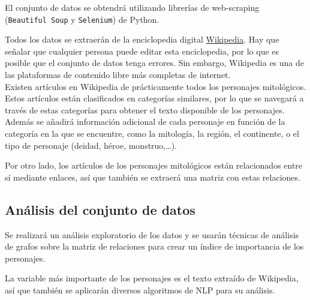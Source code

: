 \documentclass[letterpaper,11pt,twocolumn,twoside,]{pinp}
\begin{document}
El conjunto de datos se obtendrá utilizando librerías de web-scraping
(\texttt{Beautiful\ Soup} y \texttt{Selenium}) de Python.

Todos los datos se extraerán de la enciclopedia digital
\href{https://wikipedia.es}{Wikipedia}. Hay que señalar que cualquier
persona puede editar esta enciclopedia, por lo que es posible que el
conjunto de datos tenga errores. Sin embargo, Wikipedia es una de las
plataformas de contenido libre más completas de internet.\\
Existen artículos en Wikipedia de prácticamente todos los personajes
mitológicos. Estos artículos están clasificados en categorías similares,
por lo que se navegará a través de estas categorías para obtener el
texto disponible de los personajes. Además se añadirá información
adicional de cada personaje en función de la categoría en la que se
encuentre, como la mitología, la región, el continente, o el tipo de
personaje (deidad, héroe, monstruo,\ldots).

Por otro lado, los artículos de los personajes mitológicos están
relacionados entre sí mediante enlaces, así que también se extraerá una
matriz con estas relaciones.

\hypertarget{anuxe1lisis-del-conjunto-de-datos}{%
\subsection{Análisis del conjunto de
datos}\label{anuxe1lisis-del-conjunto-de-datos}}

Se realizará un análisis exploratorio de los datos y se usarán técnicas
de análisis de grafos sobre la matriz de relaciones para crear un índice
de importancia de los personajes.

La variable más importante de los personajes es el texto extraído de
Wikipedia, así que también se aplicarán diversos algoritmos de NLP para
su análisis.

\end{document}
